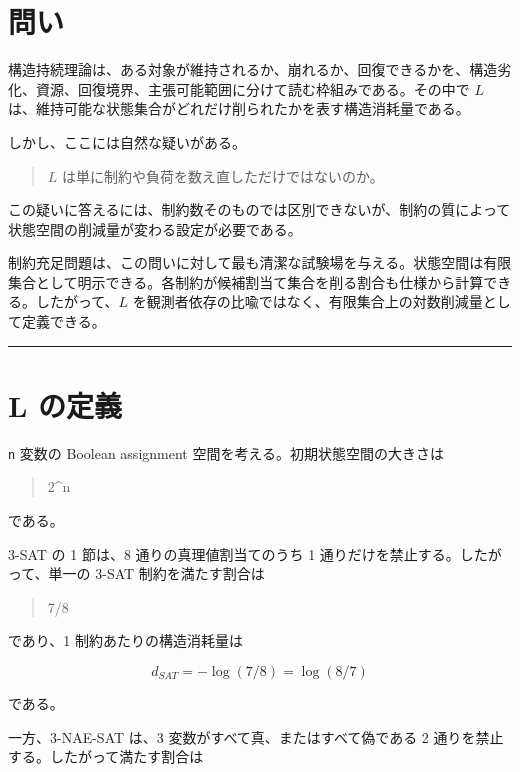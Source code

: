 \documentclass[12pt,a4paper]{article}
\begin{document}
\section{問い}\label{ux554fux3044}

構造持続理論は、ある対象が維持されるか、崩れるか、回復できるかを、構造劣化、資源、回復境界、主張可能範囲に分けて読む枠組みである。その中で $L$ は、維持可能な状態集合がどれだけ削られたかを表す構造消耗量である。

しかし、ここには自然な疑いがある。

\begin{quote}
$L$ は単に制約や負荷を数え直しただけではないのか。
\end{quote}

この疑いに答えるには、制約数そのものでは区別できないが、制約の質によって状態空間の削減量が変わる設定が必要である。

制約充足問題は、この問いに対して最も清潔な試験場を与える。状態空間は有限集合として明示できる。各制約が候補割当て集合を削る割合も仕様から計算できる。したがって、$L$ を観測者依存の比喩ではなく、有限集合上の対数削減量として定義できる。

\begin{center}\rule{0.5\linewidth}{0.5pt}\end{center}

\section{L の定義}\label{l-ux306eux5b9aux7fa9}

\texttt{n} 変数の Boolean assignment 空間を考える。初期状態空間の大きさは

\begin{quote}
\small
2\textasciicircum{}n
\end{quote}

である。

3-SAT の 1 節は、8 通りの真理値割当てのうち 1 通りだけを禁止する。したがって、単一の 3-SAT 制約を満たす割合は

\begin{quote}
\small
7/8
\end{quote}

であり、1 制約あたりの構造消耗量は

\[
d_{SAT} = -\log(7/8) = \log(8/7)
\]

である。

一方、3-NAE-SAT は、3 変数がすべて真、またはすべて偽である 2 通りを禁止する。したがって満たす割合は
\end{document}
